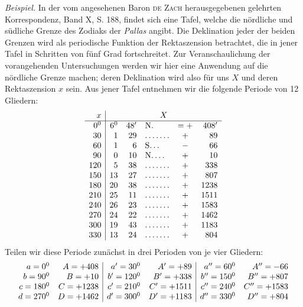 \begingroup
\renewcommand{\arraystretch}{1.45}
\textit{Beispiel.} In der vom angesehenen Baron \textsc{de Zach} herausgegebenen gelehrten Korrespondenz, Band X, S. 188, findet sich eine Tafel, welche die nördliche und südliche Grenze des Zodiaks der \textit{Pallas} angibt. Die Deklination jeder der beiden Grenzen wird als periodische Funktion der Rektaszension betrachtet, die in jener Tafel in Schritten von fünf Grad fortschreitet. Zur Veranschaulichung der vorangehenden Untersuchungen werden wir hier eine Anwendung auf die nördliche Grenze machen; deren Deklination wird also für uns $X$ und deren Rektaszension $x$ sein. Aus jener Tafel entnehmen wir die folgende Periode von 12 Gliedern:
{\small\setlength{\arraycolsep}{3pt}\[
\begin{array}{r|r r l c r}
x&\multicolumn{5}{c}{X}\\ \hline
0^{\mathord{0}}&6^{\mathord{0}}&48'&\text{N.}&=+&408'\\
30&1&29&.\,.\,.\,.\,.\,.\,.&+&89\\
60&1&6&\text{S.}\,.\,.&-&66\\
90&0&10&\text{N.}\,.\,.\,.&+&10\\
120&5&38&.\,.\,.\,.\,.\,.\,.&+&338\\
150&13&27&.\,.\,.\,.\,.\,.\,.&+&807\\
180&20&38&.\,.\,.\,.\,.\,.\,.&+&1238\\
210&25&11&.\,.\,.\,.\,.\,.\,.&+&1511\\
240&26&23&.\,.\,.\,.\,.\,.\,.&+&1583\\
270&24&22&.\,.\,.\,.\,.\,.\,.&+&1462\\
300&19&43&.\,.\,.\,.\,.\,.\,.&+&1183\\
330&13&24&.\,.\,.\,.\,.\,.\,.&+&804
\end{array}
\]}
Teilen wir diese Periode zunächst in drei Perioden von je vier Gliedern:
{\small\setlength{\arraycolsep}{3pt}\[
\begin{array}{r r|r r|r r}
a=0^{\mathord{0}}&A=+408&a'=30^{\mathord{0}}&A'=+89&a''=60^{\mathord{0}}&A''=-66\\
b=90^{\mathord{0}}&B=+10&b'=120^{\mathord{0}}&B'=+338&b''=150^{\mathord{0}}&B''=+807\\
c=180^{\mathord{0}}&C=+1238&c'=210^{\mathord{0}}&C'=+1511&c''=240^{\mathord{0}}&C''=+1583\\
d=270^{\mathord{0}}&D=+1462&d'=300^{\mathord{0}}&D'=+1183&d''=330^{\mathord{0}}&D''=+804
\end{array}
\]}
